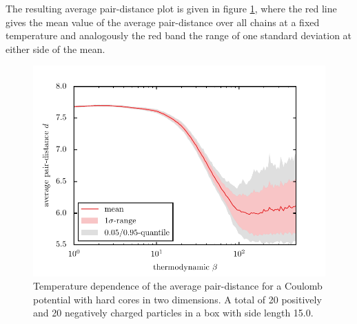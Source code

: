 \documentclass[11pt, a4paper]{article}
\numberwithin{equation}{section}
\begin{document}
The resulting average pair-distance plot is given in figure \ref{Fig:Temp_dep_Cou2D}, where the red line gives the mean value of the average pair-distance over all chains at a fixed temperature and analogously the red band the range of one standard deviation at either side of the mean.

\begin{figure}[h]
	\centering
	\includegraphics{./figures/temp_dep_coulomb2d.pdf}
	\caption{Temperature dependence of the average pair-distance for a Coulomb potential with hard cores in two dimensions.
		A total of 20 positively and 20 negatively charged particles in a box with side length 15.0.}
	\label{Fig:Temp_dep_Cou2D}
\end{figure}
\end{document}

